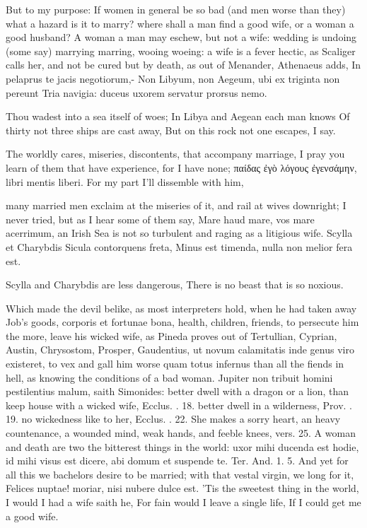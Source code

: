 {But to my purpose: If women in general be so bad (and men worse than
they) what a hazard is it to marry? where shall a man find a good wife,
or a woman a good husband? A woman a man may eschew, but not a wife:
wedding is undoing (some say) marrying marring, wooing woeing: a
wife is a fever hectic, as Scaliger calls her, and not be cured but by
death, as out of Menander, Athenaeus adds,
In pelaprus te jacis negotiorum,-
Non Libyum, non Aegeum, ubi ex triginta non pereunt
Tria navigia: duceus uxorem servatur prorsus nemo.

Thou wadest into a sea itself of woes;
In Libya and Aegean each man knows
Of thirty not three ships are cast away,
But on this rock not one escapes, I say.

The worldly cares, miseries, discontents, that accompany marriage, I
pray you learn of them that have experience, for I have none; 
\textgreek{παίδας ἐγὸ λόγους ἐγενσάμην}, libri mentis liberi. For my part I'll
dissemble with him,

many married men exclaim at the miseries of it, and rail at wives
downright; I never tried, but as I hear some of them say, Mare
haud mare, vos mare acerrimum, an Irish Sea is not so turbulent and
raging as a litigious wife.
Scylla et Charybdis Sicula contorquens freta,
Minus est timenda, nulla non melior fera est.

Scylla and Charybdis are less dangerous,
There is no beast that is so noxious.

Which made the devil belike, as most interpreters hold, when he had
taken away Job's goods, corporis et fortunae bona, health, children,
friends, to persecute him the more, leave his wicked wife, as Pineda
proves out of Tertullian, Cyprian, Austin, Chrysostom, Prosper,
Gaudentius, \etc{} ut novum calamitatis inde genus viro existeret, to vex
and gall him worse quam totus infernus than all the fiends in hell, as
knowing the conditions of a bad woman. Jupiter non tribuit homini
pestilentius malum, saith Simonides: better dwell with a dragon or a
lion, than keep house with a wicked wife, Ecclus. . 18. better dwell
in a wilderness, Prov. . 19. no wickedness like to her, Ecclus. .
22. She makes a sorry heart, an heavy countenance, a wounded mind, weak
hands, and feeble knees, vers. 25. A woman and death are two the
bitterest things in the world: uxor mihi ducenda est hodie, id mihi
visus est dicere, abi domum et suspende te. Ter. And. 1. 5. And yet for
all this we bachelors desire to be married; with that vestal virgin, we
long for it, Felices nuptae! moriar, nisi nubere dulce est. 'Tis
the sweetest thing in the world, I would I had a wife saith he,
For fain would I leave a single life,
If I could get me a good wife.

}
